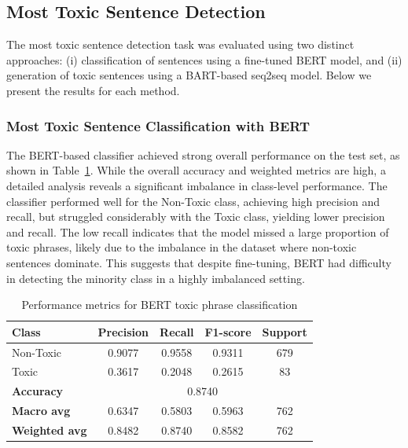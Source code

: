 \documentclass[conference]{IEEEtran}
\begin{document}
\subsection{Most Toxic Sentence Detection}
\noindent

The most toxic sentence detection task was evaluated using two distinct approaches: (i) classification of sentences using a fine-tuned BERT model, and (ii) generation of toxic sentences using a BART-based seq2seq model. Below we present the results for each method.

\subsubsection{Most Toxic Sentence Classification with BERT}
\noindent

The BERT-based classifier achieved strong overall performance on the test set, as shown in Table~\ref{tab:bert_toxic_classification}. While the overall accuracy and weighted metrics are high, a detailed analysis reveals a significant imbalance in class-level performance. The classifier performed well for the Non-Toxic class, achieving high precision and recall, but struggled considerably with the Toxic class, yielding lower precision and recall. The low recall indicates that the model missed a large proportion of toxic phrases, likely due to the imbalance in the dataset where non-toxic sentences dominate. This suggests that despite fine-tuning, BERT had difficulty in detecting the minority class in a highly imbalanced setting.

\begin{table}[H]
  \centering
  \begin{tabular}{lcccc}
    \toprule
    \textbf{Class} & \textbf{Precision} & \textbf{Recall} & \textbf{F1-score} & \textbf{Support} \\
    \midrule
    Non-Toxic & 0.9077 & 0.9558 & 0.9311 & 679 \\
    Toxic & 0.3617 & 0.2048 & 0.2615 & 83 \\
    \midrule
    \textbf{Accuracy} & \multicolumn{4}{c}{0.8740} \\
    \textbf{Macro avg} & 0.6347 & 0.5803 & 0.5963 & 762 \\
    \textbf{Weighted avg} & 0.8482 & 0.8740 & 0.8582 & 762 \\
    \bottomrule
  \end{tabular}
  \caption{Performance metrics for BERT toxic phrase classification}
  \label{tab:bert_toxic_classification}
\end{table}
\end{document}
